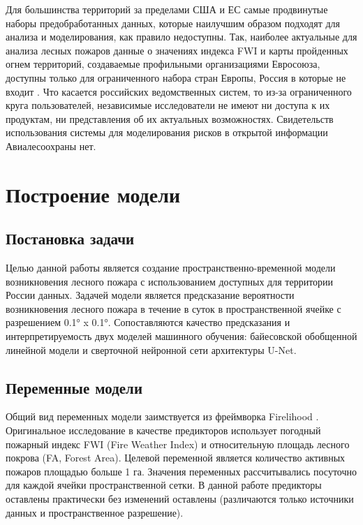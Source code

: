 \documentclass[a4paper,article,14pt]{extarticle}
\begin{document}
Для большинства территорий за пределами США и ЕС самые продвинутые наборы предобработанных данных, которые наилучшим образом подходят для анализа и моделирования, как правило недоступны. Так, наиболее актуальные для анализа лесных пожаров данные о значениях индекса FWI и карты пройденных огнем территорий, создаваемые профильными организациями Евросоюза, доступны только для ограниченного набора стран Европы, Россия в которые не входит \cite{EFFISDataRequest, CopernicusClimateChangeServiceFireDangerIndicators2020}. Что касается российских ведомственных систем, то из-за ограниченного круга пользователей, независимые исследователи не имеют ни доступа к их продуктам, ни представления об их актуальных возможностях. Свидетельств использования системы для моделирования рисков в открытой информации Авиалесоохраны нет.

\pagebreak
\section{Построение модели} %

\subsection{Постановка задачи} 

Целью данной работы является создание пространственно-временной модели возникновения лесного пожара с использованием доступных для территории России данных. Задачей модели является предсказание вероятности возникновения лесного пожара в течение в суток в пространственной ячейке с разрешением 0.1° x 0.1°. Сопоставляются качество предсказания и интерпретируемость двух моделей машинного обучения: байесовской обобщенной линейной модели и сверточной нейронной сети архитектуры U-Net.

\subsection{Переменные модели}

Общий вид переменных модели заимствуется из фреймворка Firelihood \cite{PimontPredictionRegionalWildfire2021}. Оригинальное исследование в качестве предикторов использует погодный пожарный индекс FWI (Fire Weather Index) и относительную площадь лесного покрова (FA, Forest Area). Целевой переменной является количество активных пожаров площадью больше 1 га. Значения переменных рассчитывались посуточно для каждой ячейки пространственной сетки. В данной работе предикторы оставлены практически без изменений оставлены  (различаются только источники данных и пространственное разрешение).
\end{document}
